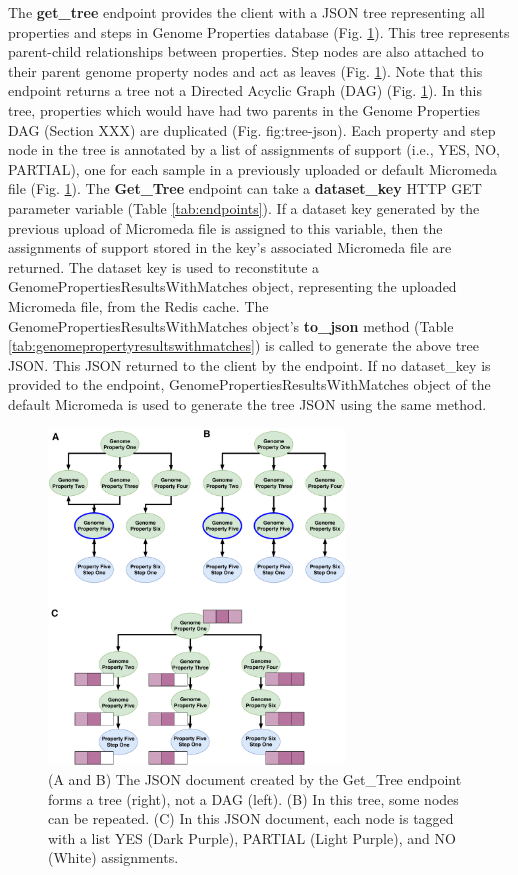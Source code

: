 The \textbf{get\_tree} endpoint provides the client with a JSON tree representing all properties and steps in Genome Properties database (Fig. \ref{fig:tree-json}). This tree represents parent-child relationships between properties. Step nodes are also attached to their parent genome property nodes and act as leaves (Fig. \ref{fig:tree-json}). Note that this endpoint returns a tree not a Directed Acyclic Graph (DAG) (Fig. \ref{fig:tree-json}). In this tree, properties which would have had two parents in the Genome Properties DAG (Section XXX) are duplicated (Fig. fig:tree-json). Each property and step node in the tree is annotated by a list of assignments of support (i.e., YES, NO, PARTIAL), one for each sample in a previously uploaded or default Micromeda file (Fig. \ref{fig:tree-json}). The \textbf{Get\_Tree} endpoint can take a \textbf{dataset\_key} HTTP GET parameter variable (Table \ref{tab:endpoints}). If a dataset key generated by the previous upload of Micromeda file is assigned to this variable, then the assignments of support stored in the key's associated Micromeda file are returned. The dataset key is used to reconstitute a GenomePropertiesResultsWithMatches object, representing the uploaded Micromeda file, from the Redis cache. The GenomePropertiesResultsWithMatches object's \textbf{to\_json} method (Table \ref{tab:genomepropertyresultswithmatches}) is called to generate the above tree JSON. This JSON returned to the client by the endpoint. If no dataset\_key is provided to the endpoint, GenomePropertiesResultsWithMatches object of the default Micromeda is used to generate the tree JSON using the same method.

\begin{figure}[!ht]
  \centering
	\includegraphics[width=0.70\textwidth]{media/Tree-JSON.pdf}
	 \caption{(A and B) The JSON document created by the Get\_Tree endpoint forms a tree (right), not a DAG (left). (B) In this tree, some nodes can be repeated. (C) In this JSON document, each node is tagged with a list YES (Dark Purple), PARTIAL (Light Purple), and NO (White) assignments.}
	 \label{fig:tree-json}
\end{figure}


